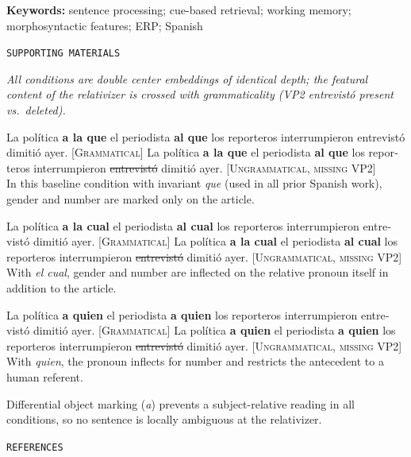 \documentclass[12pt]{article}
\newcommand{\es}[1]{\foreignlanguage{spanish}{\textit{#1}}}
\newcommand{\rel}[1]{\textbf{#1}}
\newcommand{\smallcapshead}[1]{{\color{accent}\small\texttt{\MakeUppercase{#1}}}\par\vspace{2pt}{\color{muted}\hrule}\vspace{8pt}}
\begin{document}
\vspace{6pt}

\textbf{Keywords:} sentence processing; cue-based retrieval; working memory; morphosyntactic features; ERP; Spanish

\vspace{14pt}
\smallcapshead{Supporting materials}

\textit{All conditions are double center embeddings of identical depth; the featural content of the relativizer is crossed with grammaticality (VP2 \es{entrevistó} present vs.\ deleted).}

 \foreignlanguage{spanish}{La política \rel{a la que} el periodista \rel{al que} los reporteros interrumpieron entrevistó dimitió ayer.} {\color{muted}\small\textsc{[Grammatical]}}
 \ljudge{*} \foreignlanguage{spanish}{La política \rel{a la que} el periodista \rel{al que} los reporteros interrumpieron \sout{entrevistó} dimitió ayer.} {\color{muted}\small\textsc{[Ungrammatical, missing VP2]}}\\
{\color{muted}\small In this baseline condition with invariant \es{que} (used in all prior Spanish work), gender and number are marked only on the article.}
\xe

 \foreignlanguage{spanish}{La política \rel{a la cual} el periodista \rel{al cual} los reporteros interrumpieron entrevistó dimitió ayer.} {\color{muted}\small\textsc{[Grammatical]}}
 \ljudge{*} \foreignlanguage{spanish}{La política \rel{a la cual} el periodista \rel{al cual} los reporteros interrumpieron \sout{entrevistó} dimitió ayer.} {\color{muted}\small\textsc{[Ungrammatical, missing VP2]}}\\
{\color{muted}\small With \es{el cual}, gender and number are inflected on the relative pronoun itself in addition to the article.}
\xe

 \foreignlanguage{spanish}{La política \rel{a quien} el periodista \rel{a quien} los reporteros interrumpieron entrevistó dimitió ayer.} {\color{muted}\small\textsc{[Grammatical]}}
 \ljudge{*} \foreignlanguage{spanish}{La política \rel{a quien} el periodista \rel{a quien} los reporteros interrumpieron \sout{entrevistó} dimitió ayer.} {\color{muted}\small\textsc{[Ungrammatical, missing VP2]}}\\
{\color{muted}\small With \es{quien}, the pronoun inflects for number and restricts the antecedent to a human referent.}
\xe

{\small Differential object marking (\es{a}) prevents a subject-relative reading in all conditions, so no sentence is locally ambiguous at the relativizer.\par}

\vspace{14pt}
\smallcapshead{References}

\nocite{*}
\printbibliography[heading=none]
\end{document}

